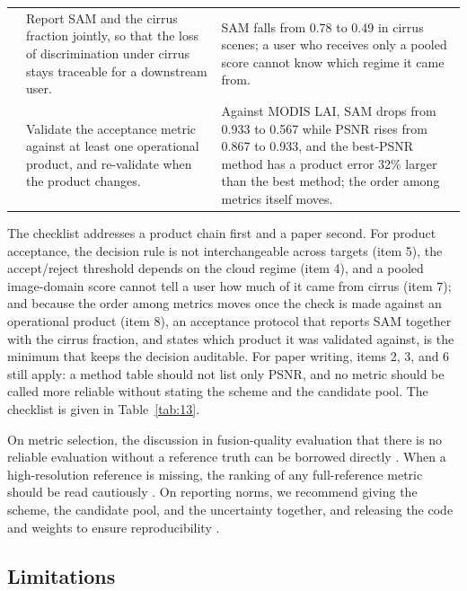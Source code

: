\documentclass[a4paper,fleqn]{cas-dc}
\begin{document}
\begin{table}[!t]
\begin{tabular}{@{}>{\centering\arraybackslash}p{0.18in}>{\raggedright\arraybackslash}p{1.28in}>{\raggedright\arraybackslash}p{1.55in}@{}}
7 & Report SAM and the cirrus fraction jointly, so that the loss of discrimination under cirrus stays traceable for a downstream user. & SAM falls from 0.78 to 0.49 in cirrus scenes; a user who receives only a pooled score cannot know which regime it came from. \\
8 & Validate the acceptance metric against at least one operational product, and re-validate when the product changes. & Against MODIS LAI, SAM drops from 0.933 to 0.567 while PSNR rises from 0.867 to 0.933, and the best-PSNR method has a product error 32\% larger than the best method; the order among metrics itself moves. \\
\hline
\end{tabular}
\end{table}

The checklist addresses a product chain first and a paper second. For product acceptance, the decision rule is not interchangeable across targets (item 5), the accept/reject threshold depends on the cloud regime (item 4), and a pooled image-domain score cannot tell a user how much of it came from cirrus (item 7); and because the order among metrics moves once the check is made against an operational product (item 8), an acceptance protocol that reports SAM together with the cirrus fraction, and states which product it was validated against, is the minimum that keeps the decision auditable. For paper writing, items 2, 3, and 6 still apply: a method table should not list only PSNR, and no metric should be called more reliable without stating the scheme and the candidate pool. The checklist is given in Table~\ref{tab:13}.

On metric selection, the discussion in fusion-quality evaluation that there is no reliable evaluation without a reference truth can be borrowed directly \cite{ref37}. When a high-resolution reference is missing, the ranking of any full-reference metric should be read cautiously \cite{ref28,ref6}. On reporting norms, we recommend giving the scheme, the candidate pool, and the uncertainty together, and releasing the code and weights to ensure reproducibility \cite{ref38}.

\subsection{Limitations}\label{sec:limits}
\end{document}
